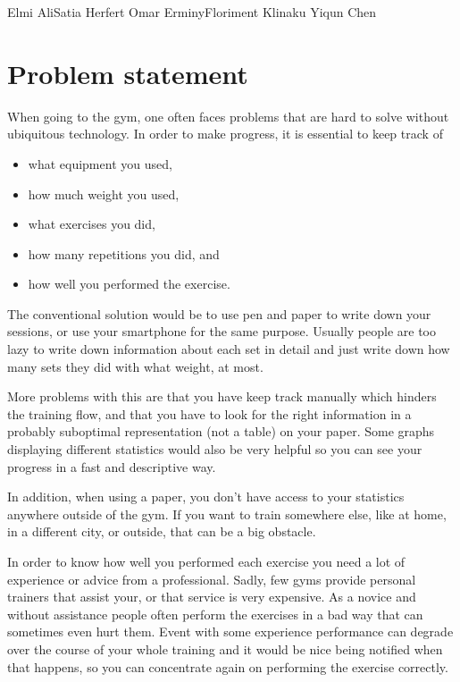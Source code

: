 \documentclass{tk3-team}
\begin{document}
%
                {Elmi Ali}{Satia Herfert}%
                {Omar Erminy}{Floriment Klinaku}%
                {Yiqun Chen}%

\section{Problem statement}

When going to the gym, one often faces problems that are hard to solve without ubiquitous technology. In order to make progress, it is essential to keep track of
\begin{itemize}
	\item what equipment you used,
	\item how much weight you used,
	\item what exercises you did,
	\item how many repetitions you did, and
	\item how well you performed the exercise.
\end{itemize}

The conventional solution would be to use pen and paper to write down your sessions, or use your smartphone for the same purpose. Usually people are too lazy to write down information about each set in detail and just write down how many sets they did with what weight, at most.

More problems with this are that you have keep track manually which hinders the training flow, and that you have to look for the right information in a probably suboptimal representation (not a table) on your paper. Some graphs displaying different statistics would also be very helpful so you can see your progress in a fast and descriptive way.

In addition, when using a paper, you don't have access to your statistics anywhere outside of the gym. If you want to train somewhere else, like at home, in a different city, or outside, that can be a big obstacle.

In order to know how well you performed each exercise you need a lot of experience or advice from a professional. Sadly, few gyms provide personal trainers that assist your, or that service is very expensive. As a novice and without assistance people often perform the exercises in a bad way that can sometimes even hurt them. Event with some experience performance can degrade over the course of your whole training and it would be nice being notified when that happens, so you can concentrate again on performing the exercise correctly.
\end{document}
